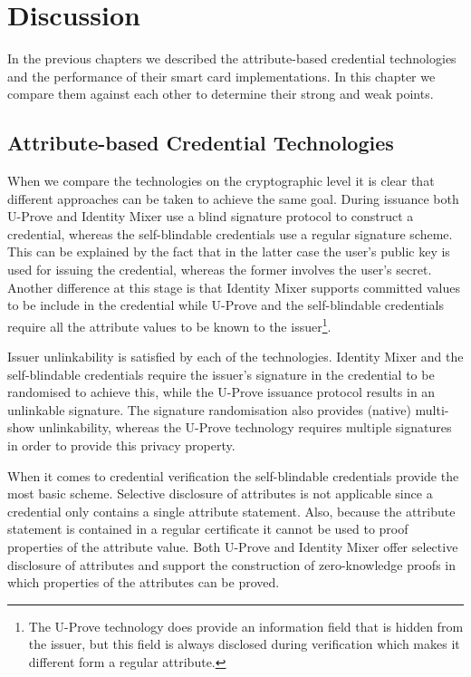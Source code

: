 \chapter{Discussion\label{chp:discussion}}

In the previous chapters we described the attribute-based credential
technologies and the performance of their smart card implementations. In this
chapter we compare them against each other to determine their strong and weak
points.

\section{Attribute-based Credential Technologies}

When we compare the technologies on the cryptographic level it is clear that
different approaches can be taken to achieve the same goal. During issuance both
U-Prove and Identity Mixer use a blind signature protocol to construct a
credential, whereas the self-blindable credentials use a regular signature
scheme. This can be explained by the fact that in the latter case the user's
public key is used for issuing the credential, whereas the former involves the
user's secret. Another difference at this stage is that Identity Mixer supports
committed values to be include in the credential while U-Prove and the
self-blindable credentials require all the attribute values to be known to the
issuer\footnote{The U-Prove technology does provide an information field that
is hidden from the issuer, but this field is always disclosed during
verification which makes it different form a regular attribute.}.

Issuer unlinkability is satisfied by each of the technologies. Identity Mixer
and the self-blindable credentials require the issuer's signature in the
credential to be randomised to achieve this, while the U-Prove issuance protocol
results in an unlinkable signature. The signature randomisation also provides
(native) multi-show unlinkability, whereas the U-Prove technology requires
multiple signatures in order to provide this privacy property.

When it comes to credential verification the self-blindable credentials provide
the most basic scheme. Selective disclosure of attributes is not applicable
since a credential only contains a single attribute statement. Also, because the
attribute statement is contained in a regular certificate it cannot be used to
proof properties of the attribute value. Both U-Prove and Identity Mixer offer
selective disclosure of attributes and support the construction of
zero-knowledge proofs in which properties of the attributes can be proved.

